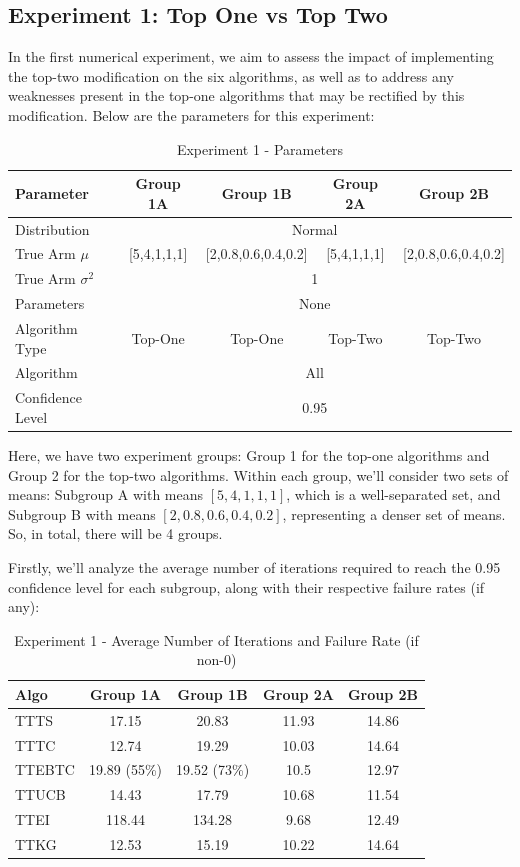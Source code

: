 \documentclass[a4paper, 12pt]{article}
\theoremstyle{definition}
\begin{document}
\subsection{Experiment 1: Top One vs Top Two}
In the first numerical experiment, we aim to assess the impact of implementing the top-two modification on the six algorithms, as well as to address any weaknesses present in the top-one algorithms that may be rectified by this modification. Below are the parameters for this experiment:

\begin{table}[hbt!]
\centering
\begin{tabular}{lcccc}
\hline
Parameter & Group 1A & Group 1B & Group 2A & Group 2B \\
\hline
Distribution & \multicolumn{4}{c}{Normal} \\
True Arm $\mu$ & [5,4,1,1,1] & [2,0.8,0.6,0.4,0.2] & [5,4,1,1,1] & [2,0.8,0.6,0.4,0.2] \\
True Arm $\sigma^2$ & \multicolumn{4}{c}{1} \\
Parameters & \multicolumn{4}{c}{None} \\
Algorithm Type & Top-One & Top-One & Top-Two & Top-Two \\
Algorithm & \multicolumn{4}{c}{All} \\
Confidence Level & \multicolumn{4}{c}{0.95} \\
\hline
\end{tabular}
\caption{Experiment 1 - Parameters}
\label{table:exp1_param}
\end{table}

Here, we have two experiment groups: Group 1 for the top-one algorithms and Group 2 for the top-two algorithms. Within each group, we'll consider two sets of means: Subgroup A with means $[5, 4, 1, 1, 1]$, which is a well-separated set, and Subgroup B with means $[2, 0.8, 0.6, 0.4, 0.2]$, representing a denser set of means. So, in total, there will be 4 groups.

Firstly, we'll analyze the average number of iterations required to reach the 0.95 confidence level for each subgroup, along with their respective failure rates (if any):

\begin{table}[hbt!]
\centering
\begin{tabular}{lcccc}
\hline
Algo & Group 1A & Group 1B & Group 2A & Group 2B \\
\hline
TTTS & 17.15 & 20.83 & 11.93 & 14.86 \\
TTTC & 12.74 & 19.29 & 10.03 & 14.64 \\
TTEBTC & 19.89 (55\%) & 19.52 (73\%) & 10.5 & 12.97 \\
TTUCB & 14.43 & 17.79 & 10.68 & 11.54 \\
TTEI & 118.44 & 134.28 & 9.68 & 12.49 \\
TTKG & 12.53 & 15.19 & 10.22 & 14.64 \\
\hline
\end{tabular}
\caption{Experiment 1 - Average Number of Iterations and Failure Rate (if non-0)}
\label{table:exp1_iter}
\end{table}
\end{document}
